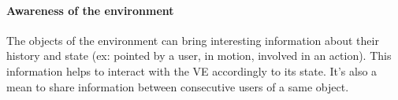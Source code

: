 \documentclass[a4paper]{article}
\begin{document}
\paragraph{Awareness of the environment}
The objects of the environment can bring interesting information about their history and state (ex: pointed by a user, in motion, involved in an action). This information helps to interact with the VE accordingly to its state. It's also a mean to share information between consecutive users of a same object.
\end{document}

